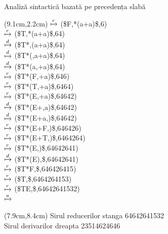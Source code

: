 \documentclass[pdf]{beamer}
\begin{document}
\begin{frame}{Analiză sintactică bazată pe precedența slabă}
\begin{textblock*}{15.8cm}(9.1cm,2.2cm)
\tiny
$\xmapsto{r}$ (\$F,*(a+a)\$,6)
\\ $\xmapsto{r}$ (\$T,*(a+a)\$,64)
\\ $\xmapsto{d}$ (\$T*,(a+a)\$,64)
\\ $\xmapsto{d}$ (\$T*(,a+a)\$,64)
\\ $\xmapsto{d}$ (\$T*(a,+a)\$,64)
\\ $\xmapsto{r}$ (\$T*(F,+a)\$,646)
\\ $\xmapsto{r}$ (\$T*(T,+a)\$,6464)
\\ $\xmapsto{r}$ (\$T*(E,+a)\$,64642)
\\ $\xmapsto{d}$ (\$T*(E+,a)\$,64642)
\\ $\xmapsto{d}$ (\$T*(E+a,)\$,64642)
\\ $\xmapsto{r}$ (\$T*(E+F,)\$,646426)
\\ $\xmapsto{r}$ (\$T*(E+T,)\$,6464264)
\\ $\xmapsto{r}$ (\$T*(E,)\$,64642641)
\\ $\xmapsto{d}$ (\$T*(E),\$,64642641)
\\ $\xmapsto{r}$ (\$T*F,\$,646426415)
\\ $\xmapsto{r}$ (\$T,\$,6464264153)
\\ $\xmapsto{r}$ (\$TE,\$,64642641532)
\\ $\xmapsto{a}$
\end{textblock*}

\begin{textblock*}{15.8cm}(7.9cm,8.4cm)
\tiny
Sirul reducerilor stanga 64642641532 \\
Sirul derivarilor dreapta 23514624646
\end{textblock*}
\end{frame}
\end{document}
